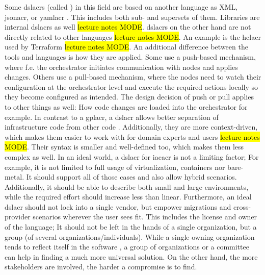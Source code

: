 \newline
Some \gls{dslacr}s (called ) in this field are based on another language as XML, \gls{jsonacr}, or \gls{yamlacr} \cite{iac_oreilly}. This includes both sub- and supersets of them. Libraries are internal \gls{dslacr}s as well \hl{lecture notes MODE}.  \gls{dslacr}s on the other hand are not directly related to other languages \hl{lecture notes MODE}. An example is the \gls{hclacr} used by Terraform \cite{iac_oreilly} \hl{lecture notes MODE}.
\newline
An additional difference between the tools and languages is how they are applied. Some use a push-based mechanism, where f.e. the orchestrator initiates communication with nodes and applies changes. Others use a pull-based mechanism, where the nodes need to watch their configuration at the orchestrator level and execute the required actions locally so they become configured as intended. The design decision of push or pull applies to other things as well: How code changes are loaded into the orchestrator for example.
\newline
In contrast to a \gls{gplacr}, a \gls{dslacr} allows better separation of infrastructure code from other code \cite{dsl_slides}. Additionally, they are more context-driven, which makes them easier to work with for domain experts and users \hl{lecture notes MODE}. Their syntax is smaller and well-defined too, which makes them less complex as well.
\newline
In an ideal world, a \gls{dslacr} for \gls{iacacr} is not a limiting factor; For example, it is not limited to full usage of virtualization, containers nor bare-metal. It should support all of those cases and also allow hybrid scenarios. Additionally, it should be able to describe both small and large environments, while the required effort should increase less than linear. Furthermore, an ideal \gls{dslacr} should not lock into a single vendor, but empower migrations and cross-provider scenarios wherever the user sees fit. This includes the license and owner of the language; It should not be left in the hands of a single organization, but a group (of several organizations/individuals). While a single owning organization tends to reflect itself in the software \cite{conways_law}, a group of organizations or a committee can help in finding a much more universal solution. On the other hand, the more stakeholders are involved, the harder a compromise is to find.

